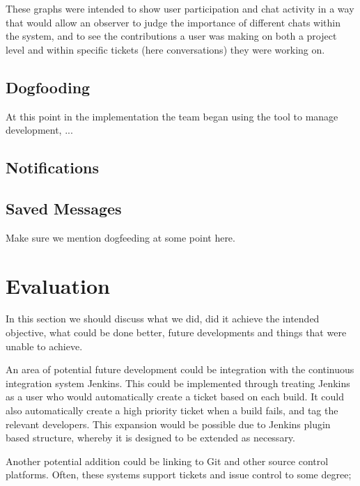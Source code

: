 \documentclass[a4paper]{l3proj}
\begin{document}
These graphs were intended to show user participation and chat activity in a way that would allow an observer to judge the importance of different chats within the system, and to see the contributions a user was making on both a project level and within specific tickets (here conversations) they were working on.

\section{Dogfooding}
\label{dog}
At this point in the implementation the team began using the tool to manage development, ... 


\section{Notifications}
\label{notifications}


\section{Saved Messages}
\label{savedMessages}

Make sure we mention dogfeeding at some point here.

\chapter{Evaluation}
\label{evaluation}

In this section we should discuss what we did, did it achieve the intended objective, what could be done better, 
future developments and things that were unable to achieve.

An area of potential future development could be integration with the continuous integration system Jenkins.  This could be implemented through treating Jenkins as a user who would automatically create a ticket based on each build.  It could also automatically create a high priority ticket when a build fails, and tag the relevant developers.  This expansion would be possible due to Jenkins plugin based structure, whereby it is designed to be extended as necessary.

Another potential addition could be linking to Git and other source control platforms. Often, these systems support tickets and issue control to some degree; 
\end{document}
